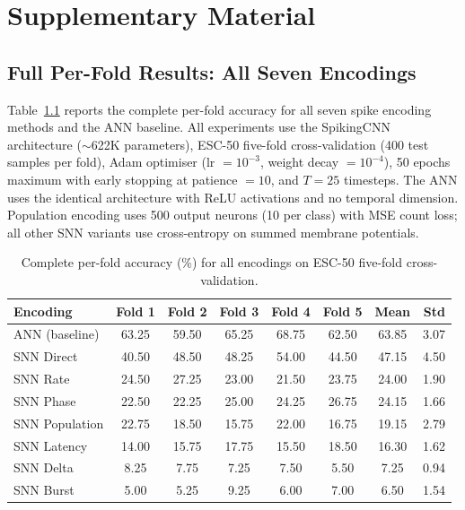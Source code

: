 
\chapter{Supplementary Material}
\label{ch:appendix}

\section{Full Per-Fold Results: All Seven Encodings}
\label{sec:app-encoding-results}

Table~\ref{tab:full-encoding} reports the complete per-fold accuracy for all seven spike encoding methods and the ANN baseline. All experiments use the SpikingCNN architecture ($\sim$622K parameters), ESC-50 five-fold cross-validation (400 test samples per fold), Adam optimiser (lr $= 10^{-3}$, weight decay $= 10^{-4}$), 50 epochs maximum with early stopping at patience $= 10$, and $T = 25$ timesteps. The ANN uses the identical architecture with ReLU activations and no temporal dimension. Population encoding uses 500 output neurons (10 per class) with MSE count loss; all other SNN variants use cross-entropy on summed membrane potentials.

\begin{table}[H]
\centering
\caption{Complete per-fold accuracy (\%) for all encodings on ESC-50 five-fold cross-validation.}
\label{tab:full-encoding}
\small
\begin{tabular}{lccccccr}
\toprule
\textbf{Encoding} & \textbf{Fold 1} & \textbf{Fold 2} & \textbf{Fold 3} & \textbf{Fold 4} & \textbf{Fold 5} & \textbf{Mean} & \textbf{Std} \\
\midrule
ANN (baseline) & 63.25 & 59.50 & 65.25 & 68.75 & 62.50 & 63.85 & 3.07 \\
\midrule
SNN Direct     & 40.50 & 48.50 & 48.25 & 54.00 & 44.50 & 47.15 & 4.50 \\
SNN Rate       & 24.50 & 27.25 & 23.00 & 21.50 & 23.75 & 24.00 & 1.90 \\
SNN Phase      & 22.50 & 22.25 & 25.00 & 24.25 & 26.75 & 24.15 & 1.66 \\
SNN Population & 22.75 & 18.50 & 15.75 & 22.00 & 16.75 & 19.15 & 2.79 \\
SNN Latency    & 14.00 & 15.75 & 17.75 & 15.50 & 18.50 & 16.30 & 1.62 \\
SNN Delta      &  8.25 &  7.75 &  7.25 &  7.50 &  5.50 &  7.25 & 0.94 \\
SNN Burst      &  5.00 &  5.25 &  9.25 &  6.00 &  7.00 &  6.50 & 1.54 \\
\bottomrule
\end{tabular}
\end{table}

